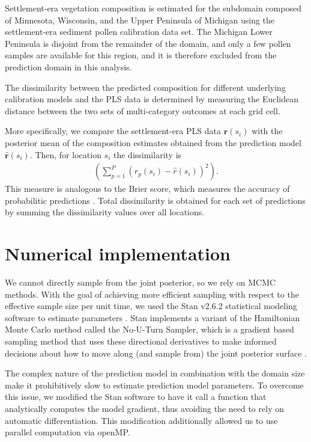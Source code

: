 \documentclass[12pt]{article}
\begin{document}
Settlement-era vegetation composition is estimated for the subdomain
composed of Minnesota, Wisconsin, and the Upper Peninsula of Michigan
using the settlement-era sediment pollen calibration data set. The
Michigan Lower Peninsula is disjoint from the remainder of the domain,
and only a few pollen samples are available for this region, and it is
therefore excluded from the prediction domain in this analysis.

The dissimilarity between the predicted composition for different
underlying calibration models and the PLS data is determined by
measuring the Euclidean distance between the two sets of
multi-category outcomes at each grid cell.

More specifically, we compare the settlement-era PLS data
$\bm{r}(s_i)$ with the posterior mean of the composition estimates
obtained from the prediction model $\hat{\bm{r}}(s_i)$. Then, for
location $s_i$ the dissimilarity is
\begin{align*}
\left( \sum_{p=1}^{P} (r_p(s_i) - \hat{r}(s_i))^2 \right).
\end{align*}
This measure is analogous to the Brier score, which measures the
accuracy of probabilitic predictions
\citep{gneiting2007strictly}. Total dissimilarity is obtained for each
set of predictions by summing the dissimilarity values over all
locations.

\section{Numerical implementation}
\label{sec:imp}

We cannot directly sample from the joint posterior, so we rely on MCMC
methods. With the goal of achieving more efficient sampling with
respect to the effective sample size per unit time, we used the Stan
v2.6.2 statistical modeling software to estimate parameters
\citep{stan-software:2014}. Stan implements a variant of the
Hamiltonian Monte Carlo method called the No-U-Turn Sampler, which is
a gradient based sampling method that uses these directional
derivatives to make informed decisions about how to move along (and
sample from) the joint posterior surface \citep{hoffman2011nuts}.

The complex nature of the prediction model in combination with the
domain size make it prohibitively slow to estimate prediction model
parameters. To overcome this issue, we modified the Stan software to
have it call a function that analytically computes the model gradient,
thus avoiding the need to rely on automatic differentiation. This
modification additionally allowed us to use parallel computation via
openMP.
\end{document}
